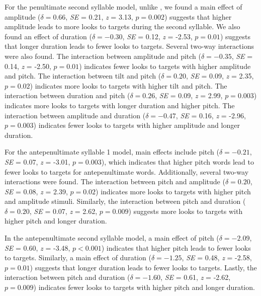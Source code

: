 For the penultimate second syllable model, unlike \cite{Sulpizio_McQueen_2012}, we found a main effect of amplitude ($\delta = 0.66$, \textit{SE} = 0.21, \textit{z} = 3.13, $p = 0.002$) suggests that higher amplitude leads to more looks to targets during the second syllable. We also found an effect of duration ($\delta = -0.30$, \textit{SE} = 0.12, \textit{z} = -2.53, $p = 0.01$) suggests that longer duration leads to fewer looks to targets. Several two-way interactions were also found. The interaction between amplitude and pitch ($\delta = -0.35$, \textit{SE} = 0.14, \textit{z} = -2.50, $p = 0.01$) indicates fewer looks to targets with higher amplitude and pitch. The interaction between tilt and pitch ($\delta = 0.20$, \textit{SE} = 0.09, \textit{z} = 2.35, $p = 0.02$) indicates more looks to targets with higher tilt and pitch. The interaction between duration and pitch ($\delta = 0.26$, \textit{SE} = 0.09, \textit{z} = 2.99, $p = 0.003$) indicates more looks to targets with longer duration and higher pitch. The interaction between amplitude and duration ($\delta = -0.47$, \textit{SE} = 0.16, \textit{z} = -2.96, $p = 0.003$) indicates fewer looks to targets with higher amplitude and longer duration.

For the antepenultimate syllable 1 model, main effects include pitch ($\delta = -0.21$, \textit{SE} = 0.07, \textit{z} = -3.01, $p = 0.003$), which indicates that higher pitch words lead to fewer looks to targets for antepenultimate words. Additionally, several two-way interactions were found. The interaction between pitch and amplitude ($\delta = 0.20$, \textit{SE} = 0.08, \textit{z} = 2.39, $p = 0.02$) indicates more looks to targets with higher pitch and amplitude stimuli. Similarly, the interaction between pitch and duration ($\delta = 0.20$, \textit{SE} = 0.07, \textit{z} = 2.62, $p = 0.009$) suggests more looks to targets with higher pitch and longer duration. 

In the antepenultimate second syllable model, a main effect of pitch ($\delta = -2.09$, \textit{SE} = 0.60, \textit{z} = -3.48, $p < 0.001$) indicates that higher pitch leads to fewer looks to targets. Similarly, a main effect of duration ($\delta = -1.25$, \textit{SE} = 0.48, \textit{z} = -2.58, $p = 0.01$) suggests that longer duration leads to fewer looks to targets. Lastly, the interaction between pitch and duration ($\delta = -1.60$, \textit{SE} = 0.61, \textit{z} = -2.62, $p = 0.009$) indicates fewer looks to targets with higher pitch and longer duration.

